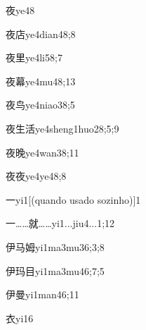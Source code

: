 \begin{verbete}{夜}{ye4}{8}
\end{verbete}
\begin{verbete}{夜店}{ye4dian4}{8;8}
\end{verbete}
\begin{verbete}{夜里}{ye4li5}{8;7}
\end{verbete}
\begin{verbete}{夜幕}{ye4mu4}{8;13}
\end{verbete}
\begin{verbete}{夜鸟}{ye4niao3}{8;5}
\end{verbete}
\begin{verbete}{夜生活}{ye4sheng1huo2}{8;5;9}
\end{verbete}
\begin{verbete}{夜晚}{ye4wan3}{8;11}
\end{verbete}
\begin{verbete}{夜夜}{ye4ye4}{8;8}
\end{verbete}
\begin{verbete}{一}{yi1}[(quando usado sozinho)]{1}
\end{verbete}
\begin{verbete}{一……就……}{yi1...jiu4...}{1;12}
\end{verbete}
\begin{verbete}{伊马姆}{yi1ma3mu3}{6;3;8}
\end{verbete}
\begin{verbete}{伊玛目}{yi1ma3mu4}{6;7;5}
\end{verbete}
\begin{verbete}{伊曼}{yi1man4}{6;11}
\end{verbete}
\begin{verbete}{衣}{yi1}{6}
\end{verbete}
